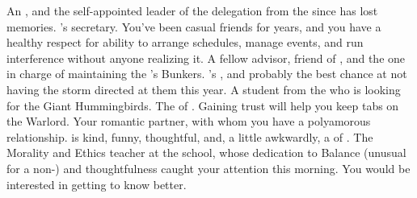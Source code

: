 \documentclass[char]{GL2020}
\begin{document}
\begin{contacts}
	\contact{\cEbbPriest{}} An \cEbb{} \cEbbPriest{\cleric}, and the self-appointed leader of the delegation from the \pShip{} since \cHeadDiplomat{} has lost \cHeadDiplomat{\their} memories.
	\contact{\cChupLeader{}} \cHeadDiplomat{}'s secretary. You've been casual friends for years, and you have a healthy respect for \cChupLeader{\their} ability to arrange schedules, manage events, and run interference without anyone realizing it.
	\contact{\cBunker{}} A fellow \pShip{} advisor, friend of \cHeadDiplomat{}, and the one in charge of maintaining the \pSc{}'s Bunkers. 
	\contact{\cPresident{}} \cHeadDiplomat{}'s \cPresident{\nibling}, and probably the \pShippies{} best chance at not having the storm directed at them this year.
	\contact{\cDisney{}} A student from the \pFarm{} who is looking for the Giant Hummingbirds.
	\contact{\cWarlordDaughter{}} The \cWarlordDaughter{\child} of \cLoud{\full}. Gaining \cWarlordDaughter{\their} trust will help you keep tabs on the Warlord. 
	\contact{\cBeetle{}} Your romantic partner, with whom you have a polyamorous relationship. \cBeetle{} is kind, funny, thoughtful, and, a little awkwardly, a \cBeetle{\cleric} of \cTechGod{}.
	\contact{\cEthics{}} The Morality and Ethics teacher at the school, whose dedication to Balance (unusual for a non-\pShip{}) and thoughtfulness caught your attention this morning. You would be interested in getting to know \cEthics{\them} better.
\end{contacts}
\end{document}
